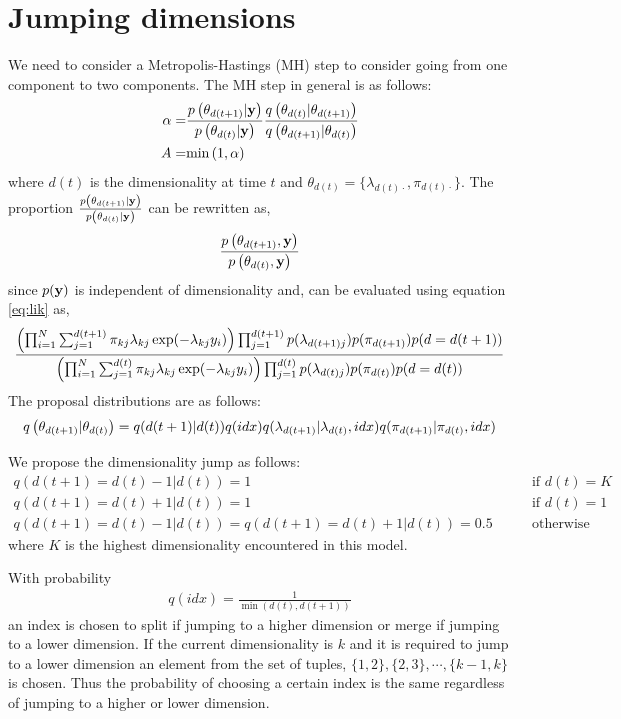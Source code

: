 \documentclass{article}
\begin{document}
\section{Jumping dimensions}
We need to consider a Metropolis-Hastings (MH) step to consider going from one component to two components. The MH step in general is as follows:
\begin{align}
\alpha = & \frac{p\left(\theta_{d(t+1)}|\mathbf{y}\right)}{p\left(\theta_{d(t)}|\mathbf{y}\right)}\frac{q\left(\theta_{d(t)}|\theta_{d(t+1)}\right)}{q\left(\theta_{d(t+1)}|\theta_{d(t)}\right)}\label{eq:alpha}\\
A = & \text{min}\left(1,\alpha\right)
\end{align}
where $d(t)$ is the dimensionality at time $t$ and $\theta_{d(t)}=\{\lambda_{d(t)\cdot},\pi_{d(t)\cdot}\}$. The proportion $\frac{p\left(\theta_{d(t+1)}|\mathbf{y}\right)}{p\left(\theta_{d(t)}|\mathbf{y}\right)}$ can be rewritten as,
\begin{align}
\frac{p\left(\theta_{d(t+1)},\mathbf{y}\right)}{p\left(\theta_{d(t)},\mathbf{y}\right)}
\end{align}
since $p(\mathbf{y})$ is independent of dimensionality and, can be evaluated using equation \ref{eq:lik} as,
\begin{align}
\frac{\left(\prod_{i=1}^{N}\sum_{j=1}^{d(t+1)}\pi_{kj}\lambda_{kj}\exp(-\lambda_{kj}y_i)\right)\prod_{j=1}^{d(t+1)}p(\lambda_{d(t+1)j})p(\pi_{d(t+1)})p(d=d(t+1))}{\left(\prod_{i=1}^{N}\sum_{j=1}^{d(t)}\pi_{kj}\lambda_{kj}\exp(-\lambda_{kj}y_i)\right)\prod_{j=1}^{d(t)}p(\lambda_{d(t)j})p(\pi_{d(t)})p(d=d(t))}
\label{eq:lik_ratio}
\end{align}
The proposal distributions are as follows:
\begin{align}
q\left(\theta_{d(t+1)}|\theta_{d(t)}\right)=q(d(t+1)|d(t))q(idx)q(\lambda_{d(t+1)}|\lambda_{d(t)},idx)q(\pi_{d(t+1)}|\pi_{d(t)},idx)
\end{align}

We propose the dimensionality jump as follows:
\begin{align}
q(d(t+1)=d(t)-1|d(t))=1\qquad&\text{if }d(t)=K\\
q(d(t+1)=d(t)+1|d(t))=1\qquad&\text{if }d(t)=1\\
q(d(t+1)=d(t)-1|d(t))=q(d(t+1)=d(t)+1|d(t))=0.5\qquad&\text{otherwise}
\end{align}
where $K$ is the highest dimensionality encountered in this model.

With probability
\begin{align}
q(idx)=\frac{1}{\min(d(t),d(t+1))}
\end{align}
an index is chosen to split if jumping to a higher dimension or merge if jumping to a lower dimension. If the current dimensionality is $k$ and it is required to jump to a lower dimension an element from the set of tuples, $\{1,2\},\{2,3\},\cdots,\{k-1,k\}$ is chosen. Thus the probability of choosing a certain index is the same regardless of jumping to a higher or lower dimension.
\end{document}

